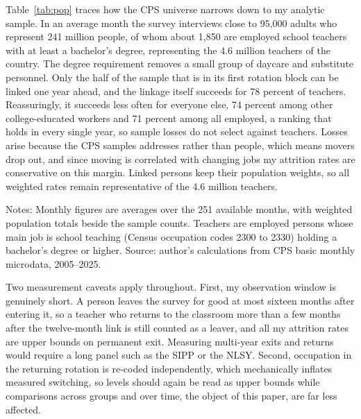 \documentclass[11pt,a4paper]{article}
\newcommand{\fignote}[1]{\par\vspace{4pt}%
  \begin{minipage}{\linewidth}\footnotesize\color{ecgray}#1\end{minipage}}
\begin{document}
Table~\ref{tab:pop} traces how the CPS universe narrows down to my analytic
sample. In an average month the survey interviews close to 95{,}000 adults
who represent 241 million people, of whom about 1{,}850 are employed school
teachers with at least a bachelor's degree, representing the 4.6 million
teachers of the country. The degree requirement removes a small group of
daycare and substitute personnel. Only the half of the sample that is in its
first rotation block can be linked one year ahead, and the linkage itself
succeeds for 78 percent of teachers. Reassuringly, it succeeds less often
for everyone else, 74 percent among other college-educated workers and 71
percent among all employed, a ranking that holds in every single year, so
sample losses do not select against teachers. Losses arise because the CPS
samples addresses rather than people, which means movers drop out, and since
moving is correlated with changing jobs my attrition rates are conservative
on this margin. Linked persons keep their population weights, so all
weighted rates remain representative of the 4.6 million teachers.

\begin{table}[htbp]
  \caption{From the CPS universe to the analytic sample.}
  \label{tab:pop}
  \centering\small
  
  \fignote{Notes: Monthly figures are averages over the 251 available months,
  with weighted population totals beside the sample counts. Teachers are
  employed persons whose main job is school teaching (Census occupation codes
  2300 to 2330) holding a bachelor's degree or higher. Source: author's
  calculations from CPS basic monthly microdata, 2005--2025.}
\end{table}

Two measurement caveats apply throughout. First, my observation window is
genuinely short. A person leaves the survey for good at most sixteen months
after entering it, so a teacher who returns to the classroom more than a few
months after the twelve-month link is still counted as a leaver, and all my
attrition rates are upper bounds on permanent exit. Measuring multi-year
exits and returns would require a long panel such as the SIPP or the NLSY.
Second, occupation in the returning rotation is re-coded independently,
which mechanically inflates measured switching, so levels should again be
read as upper bounds while comparisons across groups and over time, the
object of this paper, are far less affected.
\end{document}

